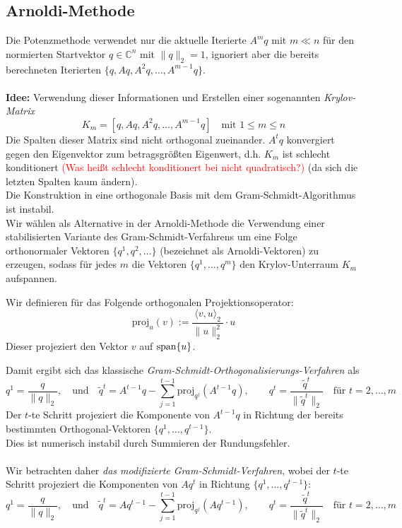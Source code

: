 \subsection{Arnoldi-Methode}
Die Potenzmethode verwendet nur die aktuelle Iterierte $A^mq$ mit $m\ll n$ für den normierten Startvektor 
$q\in\mathbb{C}^n$ mit $\|q\|_2=1$, ignoriert aber die bereits berechneten Iterierten $\{q,Aq,A^2q,\dotsc,A^{m-1}q\}$. \\ \\
\textbf{Idee:} Verwendung dieser Informationen und Erstellen einer sogenannten \textit{Krylov-Matrix}
\[K_m = [q,Aq,A^2q,\dotsc,A^{m-1}q]\quad\text{mit }1\leq m\leq n\]
Die Spalten dieser Matrix sind nicht orthogonal zueinander. $A^tq$ konvergiert gegen den Eigenvektor zum betragsgrößten
Eigenwert, d.h. $K_m$ ist schlecht konditionert \textcolor{red}{(Was heißt schlecht konditionert bei nicht quadratisch?)} (da sich die letzten Spalten kaum ändern). \\
Die Konstruktion in eine orthogonale Basis mit dem Gram-Schmidt-Algorithmus ist instabil. \\
Wir wählen als Alternative in der Arnoldi-Methode die Verwendung einer stabilisierten Variante des 
Gram-Schmidt-Verfahrens um eine Folge orthonormaler Vektoren $\{q^1,q^2,\dotsc\}$ (bezeichnet als 
Arnoldi-Vektoren) zu erzeugen, sodass für jedes $m$ die Vektoren $\{q^1,\dotsc,q^m\}$ den Krylov-Unterraum $K_m$ 
aufspannen. 
\newpage
\begin{defbox}
Wir definieren für das Folgende orthogonalen Projektionsoperator:
\[\text{proj}_u(v) := \dfrac{\langle v,u\rangle_2}{\|u\|_2^2}\cdot u\]
Dieser projeziert den Vektor $v$ auf $\text{span}\{u\}$.
\end{defbox}
Damit ergibt sich das klassische \textit{Gram-Schmidt-Orthogonalisierungs-Verfahren} als 
\[q^{1} = \dfrac{q}{\|q\|_2},\quad\text{und}\quad\tilde{q}^{t} = A^{t-1}q - \sum_{j=1}^{t-1} \text{proj}_{q^j}(A^{t-1}q), 
\qquad q^t = \dfrac{\tilde{q}^t}{\|\tilde{q}^t\|_2}\quad\text{für } t=2,\dotsc,m\]
Der $t$-te Schritt projeziert die Komponente von $A^{t-1}q$ in Richtung der bereits bestimmten Orthogonal-Vektoren 
$\{q^1,\dotsc,q^{t-1}\}$. \\
Dies ist numerisch instabil durch Summieren der Rundungsfehler. \\ \\
Wir betrachten daher \textit{das modifizierte Gram-Schmidt-Verfahren}, wobei der $t$-te Schritt projeziert die Komponenten
von $Aq^t$ in Richtung $\{q^1,\dotsc,q^{t-1}\}$:
\[q^{1} = \dfrac{q}{\|q\|_2},\quad\text{und}\quad\tilde{q}^{t} = Aq^{t-1} - \sum_{j=1}^{t-1} \text{proj}_{q^j}(Aq^{t-1}), 
\qquad q^t = \dfrac{\tilde{q}^t}{\|\tilde{q}^t\|_2}\quad\text{für } t=2,\dotsc,m \tag{1}\]
